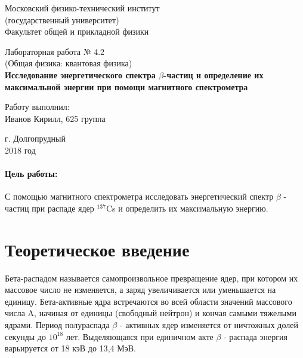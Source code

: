 \documentclass[12pt]{kiarticle}
\newcommand{\be}{\ensuremath{\beta}}
\begin{document}
	
	\begin{titlepage}
		\begin{center}
			\large 	Московский физико-технический институт \\
			(государственный университет) \\
			Факультет общей и прикладной физики \\
			\vspace{0.2cm}
			
			\vspace{4.5cm}
			Лабораторная работа № 4.2 \\ \vspace{0.2cm}
			\large (Общая физика: квантовая физика) \\ \vspace{0.2cm}
			\LARGE \textbf{ Исследование энергетического спектра \be-частиц
				и определение их максимальной энергии при помощи
				магнитного спектрометра }
		\end{center}
		\vspace{2.3cm} \large
		
		\begin{center}
			Работу выполнил: \\
			Иванов Кирилл,
			625 группа
			\vspace{10mm}		
			
		\end{center}
		
		\begin{center} \vspace{60mm}
			г. Долгопрудный \\
			2018 год
		\end{center}
	\end{titlepage}


\paragraph*{Цель работы:} С помощью магнитного спектрометра исследовать энергетический спектр $\beta$ - частиц при распаде ядер $^{137}$Cs  и определить их максимальную энергию.

\section{Теоретическое введение} 

Бета-распадом называется самопроизвольное превращение ядер, при котором их массовое число не изменяется, а заряд увеличивается или уменьшается на единицу. Бета-активные ядра встречаются во всей области значений массового числа A, начиная от единицы (свободный нейтрон) и кончая самыми тяжелыми ядрами. Период полураспада $\beta$ - активных ядер изменяется от ничтожных долей секунды до $10^{18}$ лет. Выделяющаяся при единичном акте $\beta$ - распада энергия варьируется от 18 кэВ до 13,4 МэВ.
\end{document}
